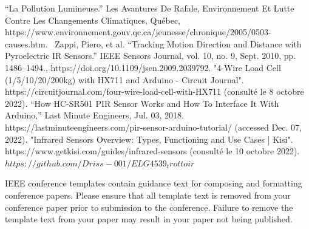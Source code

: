\documentclass[journal]{IEEEtran}
\begin{document}
\begin{thebibliography}{00}
 “La Pollution Lumineuse.” Les Avantures De Rafale, Environnement Et Lutte Contre Les Changements Climatiques, Québec, https://www.environnement.gouv.qc.ca/jeunesse/chronique/2005/0503-causes.htm. 
 Zappi, Piero, et al. “Tracking Motion Direction and Distance with Pyroelectric IR Sensors.” IEEE Sensors Journal, vol. 10, no. 9, Sept. 2010, pp. 1486–1494., https://doi.org/10.1109/jsen.2009.2039792.
 "4-Wire Load Cell (1/5/10/20/200kg) with HX711 and Arduino - Circuit Journal". https://circuitjournal.com/four-wire-load-cell-with-HX711 (consulté le 8 octobre 2022).
 “How HC-SR501 PIR Sensor Works and How To Interface It With Arduino,” Last Minute Engineers, Jul. 03, 2018. https://lastminuteengineers.com/pir-sensor-arduino-tutorial/ (accessed Dec. 07, 2022).
 "Infrared Sensors Overview: Types, Functioning and Use Cases | Kisi". https://www.getkisi.com/guides/infrared-sensors (consulté le 10 octobre 2022).
 $https://github.com/Driss-001/ELG4539_trottoir$
\end{thebibliography}
\vspace{12pt}
\color{red}
IEEE conference templates contain guidance text for composing and formatting conference papers. Please ensure that all template text is removed from your conference paper prior to submission to the conference. Failure to remove the template text from your paper may result in your paper not being published.
\end{document}
